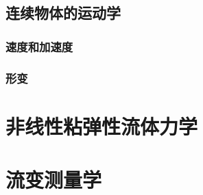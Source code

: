 \documentclass[zihao=-4,linespread=1.5,a4paper,heading=true,twoside]{ctexbook}
\theoremstyle{definition}
\theoremstyle{plain}
\begin{document}
\chapter{连续物体的运动学}\label{sec:III.6}
\section{速度和加速度}\label{sec:III.6.1}

\section{形变}\label{sec:III.6.2}


\part{非线性粘弹性流体力学}
\part{流变测量学}


%

%

%

%




\end{document}
